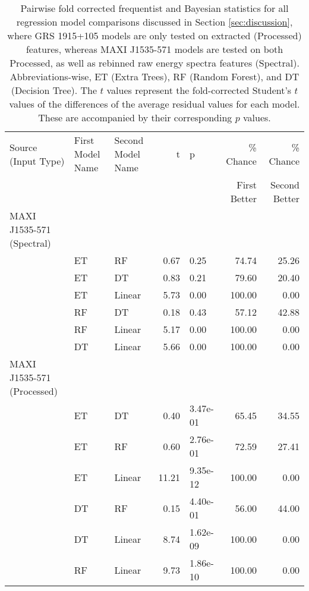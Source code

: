 \documentclass[fleqn,usenatbib,twocolumn]{mnras}%
\begin{document}
\begin{table*}
    \caption{Pairwise fold corrected frequentist and Bayesian statistics for all regression model comparisons discussed in Section \ref{sec:discussion}, where GRS 1915+105 models are only tested on extracted (Processed) features, whereas MAXI J1535-571 models are tested on both Processed, as well as rebinned raw energy spectra features (Spectral). Abbreviations-wise, ET (Extra Trees), RF (Random Forest), and DT (Decision Tree). The $t$ values represent the fold-corrected Student's $t$ values of the differences of the average residual values for each model. These are accompanied by their corresponding $p$ values.}
    \label{tab:pairwise}
    \centering

    \begin{tabular}{lllrlrr}
\toprule
Source (Input Type) & First Model Name & Second Model Name &    t &            p &  \% Chance & \% Chance \\ & & & & & First Better & Second Better \\
\midrule
MAXI J1535-571 (Spectral) & & & & & & \\
&  ET & RF & 0.67 & 0.25 &                  74.74 &                   25.26 \\
&  ET & DT & 0.83 & 0.21 &                  79.60 &                   20.40 \\
&  ET & Linear & 5.73 & 0.00 &                 100.00 &                    0.00 \\
& RF & DT & 0.18 & 0.43 &                  57.12 &                   42.88 \\
& RF & Linear & 5.17 & 0.00 &                 100.00 &                    0.00 \\
& DT & Linear & 5.66 & 0.00 &                 100.00 &                    0.00 \\
MAXI J1535-571 (Processed) & & & & & & \\
&  ET & DT &  0.40 & 3.47e-01 &                  65.45 &                   34.55 \\
&  ET & RF &  0.60 & 2.76e-01 &                  72.59 &                   27.41 \\
&  ET & Linear & 11.21 & 9.35e-12 &                 100.00 &                    0.00 \\
& DT & RF &  0.15 & 4.40e-01 &                  56.00 &                   44.00 \\
& DT & Linear &  8.74 & 1.62e-09 &                 100.00 &                    0.00 \\
& RF & Linear &  9.73 & 1.86e-10 &                 100.00 &                    0.00 \\

\end{tabular}
\end{table*}
\end{document}

